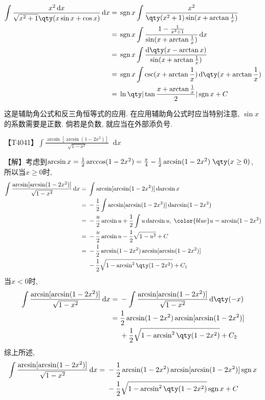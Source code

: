 \documentclass{ctexbook}
\DeclareMathOperator{\sgn}{sgn}
\newcommand*{\dif}{\mathop{}\!\mathrm{d}}
\begin{document}
{\begin{align*}
\int\frac{x^{2}\dif{x}}{\sqrt{x^{2}+1}\qty(x\sin{x}+\cos{x})}\dif{x}={}&\sgn{x}\int\frac{x^{2}}{\qty(x^{2}+1)\sin(x+\arctan{\frac{1}{x}})}\\
={}&\sgn{x}\int\frac{1-\frac{1}{x^{2}+1}}{\sin(x+\arctan{\frac{1}{x}})}\dif{x}\\
={}&\sgn{x}\int\frac{\dif{\qty(x-\arctan{x})}}{\sin(x+\arctan{\frac{1}{x}})}\\
={}&\sgn{x}\int\csc(x+\arctan{\frac{1}{x}})\dif{\qty(x+\arctan{\frac{1}{x}})}\\
={}&\ln\qty|\tan{\frac{x+\arctan{\frac{1}{x}}}{2}}|\sgn{x}+C
\end{align*}\par
{\kaishu 这是辅助角公式和反三角恒等式的应用. 在应用辅助角公式时应当特别注意, $\sin{x}$的系数需要是正数. 倘若是负数, 就应当在外部添负号. \par}
【T4041】$\int\frac{\arcsin[\arcsin(1-2x^{2})]}{\sqrt{1-x^{2}}}\dif{x}$\par
【解】考虑到$\arcsin{x}=\frac{1}{2}\arccos(1-2x^{2})=\frac{\pi}{4}-\frac{1}{2}\arcsin(1-2x^{2})\;\qty(x\ge0)$, 所以当$x\ge0$时, 
\begin{align*}
\int\frac{\arcsin[\arcsin(1-2x^{2})]}{\sqrt{1-x^{2}}}\dif{x}={}&\int\arcsin[\arcsin(1-2x^{2})]\dif{\arcsin{x}}\\
={}&-\frac{1}{2}\int\arcsin[\arcsin(1-2x^{2})]\dif{\arcsin(1-2x^{2})}\\
={}&-\frac{u}{2}\arcsin{u}+\frac{1}{2}\int u\dif{\arcsin{u}},\;{\color{blue}u=\arcsin(1-2x^{2})}\\
={}&-\frac{u}{2}\arcsin{u}-\frac{1}{2}\sqrt{1-u^{2}}+C\\
={}&-\frac{1}{2}\arcsin(1-2x^{2})\arcsin[\arcsin(1-2x^{2})]\\
{}&-\frac{1}{2}\sqrt{1-\arcsin^{2}\qty(1-2x^{2})}+C_{1}
\end{align*}
当$x<0$时, 
\begin{align*}
\int\frac{\arcsin[\arcsin(1-2x^{2})]}{\sqrt{1-x^{2}}}\dif{x}={}&-\int\frac{\arcsin[\arcsin(1-2x^{2})]}{\sqrt{1-x^{2}}}\dif{\qty(-x)}\\
={}&\frac{1}{2}\arcsin(1-2x^{2})\arcsin[\arcsin(1-2x^{2})]\\
{}&+\frac{1}{2}\sqrt{1-\arcsin^{2}\qty(1-2x^{2})}+C_{2}
\end{align*}
综上所述, 
\begin{align*}
\int\frac{\arcsin[\arcsin(1-2x^{2})]}{\sqrt{1-x^{2}}}\dif{x}={}&-\frac{1}{2}\arcsin(1-2x^{2})\arcsin[\arcsin(1-2x^{2})]\sgn{x}\\
{}&-\frac{1}{2}\sqrt{1-\arcsin^{2}\qty(1-2x^{2})}\sgn{x}+C

\end{align*}}
\end{document}
